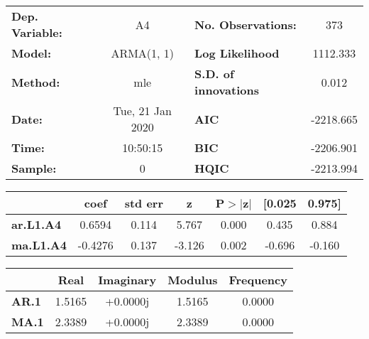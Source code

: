 \begin{center}
\begin{tabular}{lclc}
\toprule
\textbf{Dep. Variable:} &             A4            & \textbf{  No. Observations:  } &            373             \\
\textbf{Model:}         &         ARMA(1, 1)        & \textbf{  Log Likelihood     } &          1112.333          \\
\textbf{Method:}        &            mle            & \textbf{  S.D. of innovations} &           0.012            \\
\textbf{Date:}          &      Tue, 21 Jan 2020     & \textbf{  AIC                } &         -2218.665          \\
\textbf{Time:}          &          10:50:15         & \textbf{  BIC                } &         -2206.901          \\
\textbf{Sample:}        &             0             & \textbf{  HQIC               } &         -2213.994          \\
\bottomrule
\end{tabular}
\begin{tabular}{lcccccc}
                  & \textbf{coef} & \textbf{std err} & \textbf{z} & \textbf{P$>$$|$z$|$} & \textbf{[0.025} & \textbf{0.975]}  \\
\midrule
\textbf{ar.L1.A4} &       0.6594  &        0.114     &     5.767  &         0.000        &        0.435    &        0.884     \\
\textbf{ma.L1.A4} &      -0.4276  &        0.137     &    -3.126  &         0.002        &       -0.696    &       -0.160     \\
\bottomrule
\end{tabular}
\begin{tabular}{lcccc}
              & \textbf{            Real} & \textbf{         Imaginary} & \textbf{         Modulus} & \textbf{        Frequency}  \\
\midrule
\textbf{AR.1} &                1.5165     &                +0.0000j     &                1.5165     &                0.0000       \\
\textbf{MA.1} &                2.3389     &                +0.0000j     &                2.3389     &                0.0000       \\
\bottomrule
\end{tabular}
\end{center}